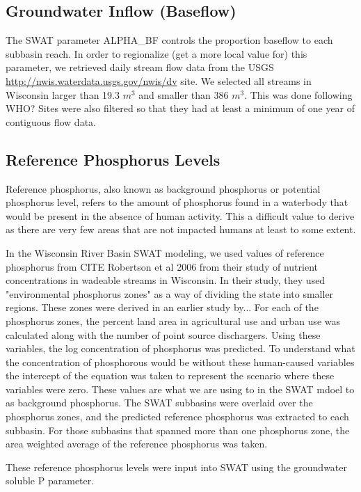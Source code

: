 \subsection{Groundwater Inflow (Baseflow)}
	The SWAT parameter ALPHA\_BF controls the proportion baseflow to each subbasin reach. In order to regionalize (get a more local value for) this parameter, we retrieved daily stream flow data from the USGS \href{NWIS}{http://nwis.waterdata.usgs.gov/nwis/dv} site. We selected all streams in Wisconsin larger than 19.3 $m^3$ and smaller than 386 $m^3$. This was done following WHO? Sites were also filtered so that they had at least a minimum of one year of contiguous flow data. 

\subsection{Reference Phosphorus Levels}
	Reference phosphorus, also known as background phosphorus or potential phosphorus level, refers to the amount of phosphorus found in a waterbody that would be present in the absence of human activity. This a difficult value to derive as there are very few areas that are not impacted humans at least to some extent. 
	
	In the Wisconsin River Basin SWAT modeling, we used values of reference phosphorus from CITE Robertson et al 2006 from their study of nutrient concentrations in wadeable streams in Wisconsin. In their study, they used "environmental phosphorus zones" as a way of dividing the state into smaller regions. These zones were derived in an earlier study by...
	For each of the phosphorus zones, the percent land area in agricultural use and urban use was calculated along with the number of point source dischargers. Using these variables, the log concentration of phosphorus was predicted. To understand what the concentration of phosphorous would be without these human-caused variables the intercept of the equation was taken to represent the scenario where these variables were zero. These values are what we are using to in the SWAT mdoel to as background phosphorus. The SWAT subbasins were overlaid over the phosphorus zones, and the predicted reference phosphorus was extracted to each subbasin. For those subbasins that spanned more than one phosphorus zone, the area weighted average of the reference phosphorus was taken.
	
	These reference phosphorus levels were input into SWAT using the groundwater soluble P parameter.